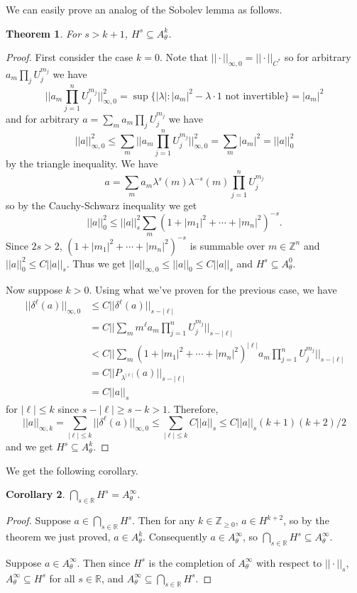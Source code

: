 \documentclass[10pt]{article}
\newtheorem{thm}{Theorem}[section]
\newtheorem{cor}[thm]{Corollary}
\theoremstyle{remark}
\theoremstyle{definition}
\begin{document}
We can easily prove an analog of the Sobolev lemma as follows.
\begin{thm}
For $s>k+1$, $H^s\subseteq A_{\theta}^k$.
\end{thm}
\begin{proof}
First consider the case $k=0$.
Note that $||\cdot||_{\infty,0}=||\cdot||_{C^*}$
so for arbitrary $a_m\prod_jU_j^{m_j}$ we have
$$||a_m\prod_{j=1}^nU_j^{m_j}||_{\infty,0}^2=\sup\{|\lambda|:
|a_m|^2-\lambda\cdot 1\text{ not invertible}\}=|a_m|^2$$
and for arbitrary $a=\sum_ma_m\prod_jU_j^{m_j}$ we have
$$||a||_{\infty,0}^2\le\sum_m||a_m\prod_{j=1}^nU_j^{m_j}||_{\infty,0}^2
=\sum_m|a_m|^2=||a||_0^2$$ by the triangle inequality.
We have $$a=\sum_ma_m\lambda^s(m)\lambda^{-s}(m)\prod_{j=1}^nU_j^{m_j}$$
so by the Cauchy-Schwarz inequality we get
$$||a||_0^2\le||a||_s^2\sum_m(1+|m_1|^2+\cdots+|m_n|^2)^{-s}.$$
Since $2s>2$, $(1+|m_1|^2+\cdots+|m_n|^2)^{-s}$ is summable over
$m\in\mathbb Z^n$ and $||a||_0^2\le C||a||_s$. Thus we get
$||a||_{\infty,0}\le||a||_0\le C||a||_s$ and $H^s\subseteq A_{\theta}^0$.

Now suppose $k>0$. Using what we've proven for the previous case, we have
\begin{align*}
||\delta^{\ell}(a)||_{\infty,0} &\le C||\delta^{\ell}(a)||_{s-|\ell|} \\
&= C||\sum_m m^{\ell}a_m\prod_{j=1}^nU_j^{m_j}||_{s-|\ell|} \\
&< C||\sum_m(1+|m_1|^2+\cdots+|m_n|^2)^{|\ell|}
a_m\prod_{j=1}^nU_j^{m_j}||_{s-|\ell|} \\
&= C||P_{\lambda^{|\ell|}}(a)||_{s-|\ell|} \\
&= C||a||_s
\end{align*}
for $|\ell|\le k$ since $s-|\ell|\ge s-k>1$.
Therefore,
$$||a||_{\infty,k}=\sum_{|\ell|\le k}||\delta^{\ell}(a)||_{\infty,0}
\le\sum_{|\ell|\le k}C||a||_s
\le C||a||_s(k+1)(k+2)/2$$
and we get $H^s\subseteq A_{\theta}^k$.
\end{proof}
We get the following corollary.
\begin{cor}
$\displaystyle\bigcap_{s\in\mathbb R}H^s=A_{\theta}^{\infty}$.
\end{cor}
\begin{proof}
Suppose $a\in\bigcap_{s\in\mathbb R}H^s$. Then for any
$k\in\mathbb Z_{\ge 0}$, $a\in H^{k+2}$, so by the theorem we just proved,
$a\in A_{\theta}^k$. Consequently $a\in A_{\theta}^{\infty}$, so
$\bigcap_{s\in\mathbb R}H^s\subseteq A_{\theta}^{\infty}$.

Suppose $a\in A_{\theta}^{\infty}$. Then since
$H^s$ is the completion of $A_{\theta}^{\infty}$ with respect to $||\cdot||_s$,
$A_{\theta}^{\infty}\subseteq H^s$ for all $s\in\mathbb R$, and
$A_{\theta}^{\infty}\subseteq\bigcap_{s\in\mathbb R}H^s$.
\end{proof}
\end{document}
